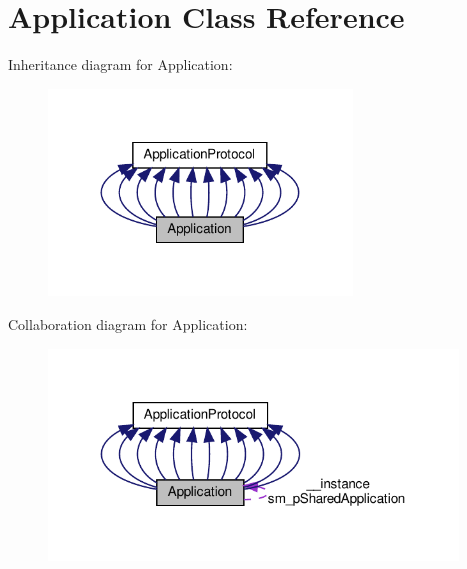 \hypertarget{classApplication}{}\section{Application Class Reference}
\label{classApplication}


Inheritance diagram for Application\+:
\nopagebreak
\begin{figure}[H]
\begin{center}
\leavevmode
\includegraphics[width=229pt]{classApplication__inherit__graph}
\end{center}
\end{figure}


Collaboration diagram for Application\+:
\nopagebreak
\begin{figure}[H]
\begin{center}
\leavevmode
\includegraphics[width=308pt]{classApplication__coll__graph}
\end{center}
\end{figure}
